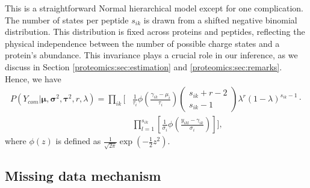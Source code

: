 This is a straightforward Normal hierarchical model except for one complication.
%
The number of states per peptide $s_{ik}$ is drawn from a shifted negative binomial distribution.
This distribution is fixed across proteins and peptides, reflecting the physical independence between the number of possible charge states and a protein's abundance.
This invariance plays a crucial role in our inference, as we discuss in Section \ref{proteomics:sec:estimation} and \ref{proteomics:sec:remarks}.
Hence, we have
\begin{align}
\label{proteomics:eq:complete_data_likelihood}
P(Y_{com} | \bm \mu, \bm \sigma^2, \bm \tau^2, r, \lambda) =
\prod_{ik} \Bigg[& \frac{1}{\tau_i} \phi\left( \frac{\gamma_{ik} - \mu_i}{\tau_i} \right)
\begin{pmatrix} s_{ik} + r - 2 \\ s_{ik} - 1 \end{pmatrix} \lambda^{r} (1 - \lambda)^{s_{ik} - 1} \cdot \\
\nonumber
& \prod_{l=1}^{s_{ik}} \left[ \frac{1}{\sigma_i} \phi\left( \frac{y_{ikl} -  \gamma_{ik}}{\sigma_i} \right) \right] \Bigg],
\end{align}
where $\phi(z)$ is defined as $\frac{1}{\sqrt{2 \pi}} \exp\left( -\frac{1}{2} z^2 \right)$.



\subsection{Missing data mechanism}
\label{proteomics:sec:mdm}

